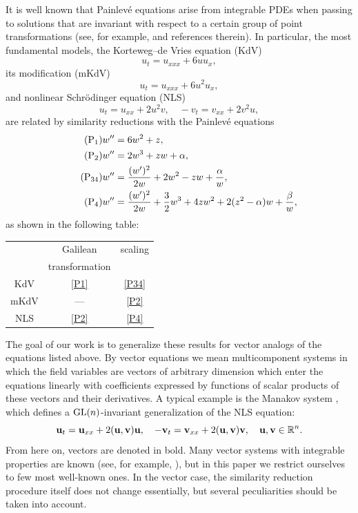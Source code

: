 \documentclass[11pt]{article}
\theoremstyle{plain}
\theoremstyle{definition}
\begin{document}
It is well known that Painlev\'e equations arise from integrable PDEs when passing to solutions that are invariant with respect to a certain group of point transformations (see, for example, \cite{ConteMusette} and references therein). In particular, the most fundamental models, the Korteweg--de Vries equation (KdV) 
\[
 u_t=u_{xxx}+6uu_x,   
\]
its modification (mKdV) 
\[
 u_t=u_{xxx}+6u^2u_x,
\]
and nonlinear Schr\"odinger equation (NLS)
\[
 u_t=u_{xx}+2u^2v,\quad -v_t=v_{xx}+2v^2u,
\]
are related by similarity reductions with the Painlev\'e equations
\begin{align}
\label{P1}\tag{P$_1$}
 w''&= 6w^2+z,\\
\label{P2}\tag{P$_2$}
 w''&=2w^3+zw+\alpha,\\
\label{P34}\tag{P$_{34}$}
 w''&=\frac{(w')^2}{2w}+2w^2-zw+\frac{\alpha}{w},\\
\label{P4}\tag{P$_4$}
 w''&=\frac{(w')^2}{2w}+\frac{3}{2}w^3+4zw^2+2(z^2-\alpha)w+\frac{\beta}{w},
\end{align}
as shown in the following table:
\begin{center}
\begin{tabular}{c|cc}
    & Galilean & scaling \\
    & transformation & \\
\hline
KdV  & \ref*{P1} & \ref*{P34} \\
mKdV & ---       & \ref*{P2} \\
NLS  & \ref*{P2} & \ref*{P4} \\
\end{tabular}
\end{center}
The goal of our work is to generalize these results for vector analogs of the equations listed above. By vector equations we mean multicomponent systems in which the field variables are vectors of arbitrary dimension which enter the equations linearly with coefficients expressed by functions of scalar products of these vectors and their derivatives. A typical example is the Manakov system \cite{Manakov_1973}, which defines a ${\rm GL}(n)$-invariant generalization of the NLS equation:
\[
  {\bf u}_t={\bf u}_{xx}+2({\bf u},{\bf v}){\bf u},\quad 
 -{\bf v}_t={\bf v}_{xx}+2({\bf u},{\bf v}){\bf v},\quad 
  {\bf u},{\bf v}\in{\mathbb R}^n.
\]
From here on, vectors are denoted in bold. Many vector systems with integrable properties are known (see, for example, \cite{Sokolov_Svinolupov_1994, Sokolov-Wolf, Meshkov-Sokolov}), but in this paper we restrict ourselves to few most well-known ones. In the vector case, the similarity reduction procedure itself does not change essentially, but several peculiarities should be taken into account.
\end{document}

